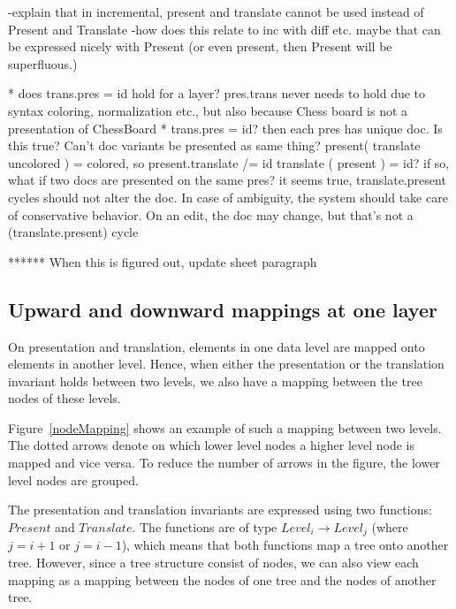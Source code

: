  -explain that in incremental, present and translate cannot be used instead of Present and Translate
 -how does this relate to inc with diff etc. maybe that can be expressed nicely with Present
 (or even present, then Present will be superfluous.)

* does   trans.pres = id hold for a layer? pres.trans never needs to hold due to syntax coloring, normalization etc., but also because Chess board is not a presentation of ChessBoard   
* trans.pres = id? then each pres has unique doc. Is this true? Can't doc variants be presented as same thing?
   present( translate uncolored ) = colored, so present.translate /= id
   translate ( present ) = id? if so, what if two docs are presented on the same pres?
 it seems true, translate.present cycles should not alter the doc. In case of ambiguity, the system should
 take care of conservative behavior. On an edit, the doc may change, but that's not a (translate.present) cycle


 ****** When this is figured out, update sheet paragraph
\ec


%																
\subsection{Upward and downward mappings at one layer} \label{mappingsInLayer}


On presentation and translation, elements in one data level are mapped onto elements in another level. Hence, when either the presentation or the translation invariant holds between two levels, we also have a mapping between the tree nodes of these levels. 

Figure~\ref{nodeMapping} shows an example of such a mapping between two levels. The dotted arrows denote on which lower level nodes a higher level node is mapped and vice versa. To reduce the number of arrows in the figure, the lower level nodes are grouped.

\bc The presentation and translation invariants are expressed using two functions: $Present$ and $Translate$. The functions are of type $Level_i \rightarrow Level_j$ (where $j = i+1$ or
$j = i-1$), which means that both functions map a tree onto another tree. However, since a tree structure consist of nodes, we can also view each mapping as a mapping between the nodes of one tree and the nodes of another tree.  
\ec

